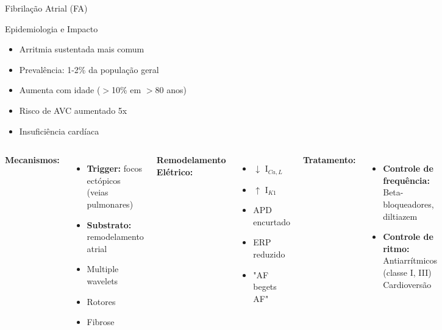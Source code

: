 \begin{frame}{Fibrilação Atrial (FA)}
\begin{block}{Epidemiologia e Impacto}
\begin{itemize}
    \item Arritmia sustentada mais comum
    \item Prevalência: 1-2\% da população geral
    \item Aumenta com idade ($>$10\% em $>$80 anos)
    \item Risco de AVC aumentado 5x
    \item Insuficiência cardíaca
\end{itemize}
\end{block}

\vspace{0.3cm}

\begin{columns}
\textbf{Mecanismos:}
\begin{itemize}
    \item \textbf{Trigger:} focos ectópicos (veias pulmonares)
    \item \textbf{Substrato:} remodelamento atrial
    \item Multiple wavelets
    \item Rotores
    \item Fibrose
\end{itemize}

\vspace{0.3cm}

\textbf{Remodelamento Elétrico:}
\begin{itemize}
    \item $\downarrow$ I$_{Ca,L}$
    \item $\uparrow$ I$_{K1}$
    \item APD encurtado
    \item ERP reduzido
    \item "AF begets AF"
\end{itemize}

\textbf{Tratamento:}
\begin{itemize}
    \item \textbf{Controle de frequência:}\\
    Beta-bloqueadores, diltiazem

    \item \textbf{Controle de ritmo:}\\
    Antiarrítmicos (classe I, III)\\
    Cardioversão


\end{itemize}
\end{columns}
\end{frame}
